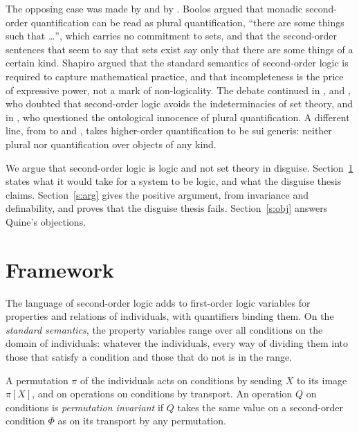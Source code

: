 \documentclass{situationist-preprint}
\begin{document}
The opposing case was made by \citet{Boolos1975,Boolos1984} and by \citet{Shapiro1991}. Boolos argued that monadic second-order quantification can be read as plural quantification, \enquote{there are some things such that \ldots}, which carries no commitment to sets, and that the second-order sentences that seem to say that sets exist say only that there are some things of a certain kind. Shapiro argued that the standard semantics of second-order logic is required to capture mathematical practice, and that incompleteness is the price of expressive power, not a mark of non-logicality. The debate continued in \citet{Resnik1988}, \citet{Jane1993} and \citet{Vaananen2001}, who doubted that second-order logic avoids the indeterminacies of set theory, and in \citet{Linnebo2003}, who questioned the ontological innocence of plural quantification. A different line, from \citet{Prior1971} to \citet{Williamson2003} and \citet{Wright2007}, takes higher-order quantification to be sui generis: neither plural nor quantification over objects of any kind.

We argue that second-order logic is logic and not set theory in disguise. Section~\ref{s:frame} states what it would take for a system to be logic, and what the disguise thesis claims. Section~\ref{s:arg} gives the positive argument, from invariance and definability, and proves that the disguise thesis fails. Section~\ref{s:obj} answers Quine's objections.

\section{Framework}\label{s:frame}

\begin{definition}\label{d:sol}
The language of second-order logic adds to first-order logic variables for properties and relations of individuals, with quantifiers binding them. On the \emph{standard semantics}, the property variables range over all conditions on the domain of individuals: whatever the individuals, every way of dividing them into those that satisfy a condition and those that do not is in the range.
\end{definition}

\begin{definition}\label{d:action}
A permutation $\pi$ of the individuals acts on conditions by sending $X$ to its image $\pi[X]$, and on operations on conditions by transport. An operation $Q$ on conditions is \emph{permutation invariant} if $Q$ takes the same value on a second-order condition $\Phi$ as on its transport by any permutation.
\end{definition}
\end{document}
